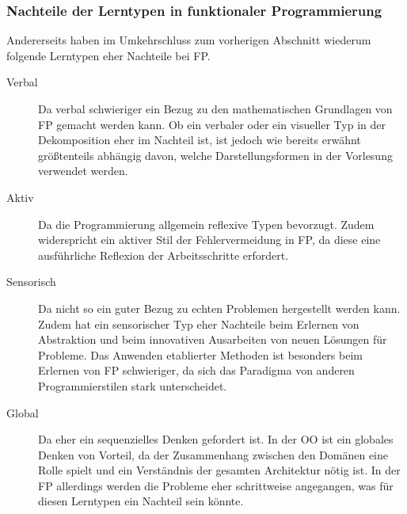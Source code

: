 \subsubsection{Nachteile der Lerntypen in funktionaler Programmierung}

Andererseits haben im Umkehrschluss zum vorherigen Abschnitt wiederum folgende Lerntypen eher Nachteile bei FP.

\begin{description}
    \item[Verbal] Da verbal schwieriger ein Bezug zu den mathematischen Grundlagen von FP gemacht werden kann. Ob ein verbaler oder ein visueller Typ in der Dekomposition eher im Nachteil ist, ist jedoch wie bereits erwähnt größtenteils abhängig davon, welche Darstellungsformen in der Vorlesung verwendet werden.
    \item[Aktiv] Da die Programmierung allgemein reflexive Typen bevorzugt. Zudem widerspricht ein aktiver Stil der Fehlervermeidung in FP, da diese eine ausführliche Reflexion der Arbeitsschritte erfordert.
    \item[Sensorisch] Da nicht so ein guter Bezug zu echten Problemen hergestellt werden kann. Zudem hat ein sensorischer Typ eher Nachteile beim Erlernen von Abstraktion und beim innovativen Ausarbeiten von neuen Lösungen für Probleme. Das Anwenden etablierter Methoden ist besonders beim Erlernen von FP schwieriger, da sich das Paradigma von anderen Programmierstilen stark unterscheidet.
    \item[Global] Da eher ein sequenzielles Denken gefordert ist. In der OO ist ein globales Denken von Vorteil, da der Zusammenhang zwischen den Domänen eine Rolle spielt und ein Verständnis der gesamten Architektur nötig ist. In der FP allerdings werden die Probleme eher schrittweise angegangen, was für diesen Lerntypen ein Nachteil sein könnte.
\end{description}